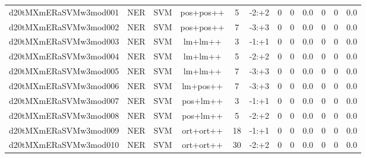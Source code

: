 \documentclass[a4paper]{article}
\begin{document}
\begin{landscape}
\begin{center}
\begin{tabular}{ |c|c|c|c|c|c|c|c|c|c|c|c|}
 
 	
 	\small{ d20tMXmERaSVMw3mod001 } & \small{ NER} & \small{  SVM }  & pos+pos++  &  5 &  \small{  -2:+2 }  &  0 & 0 & 0.0  &  0 & 0 & 0.0 \\
 	

 
 	
 	\small{ d20tMXmERaSVMw3mod002 } & \small{ NER} & \small{  SVM }  & pos+pos++  &  7 &  \small{  -3:+3 }  &  0 & 0 & 0.0  &  0 & 0 & 0.0 \\
 	

 
 	
 	\small{ d20tMXmERaSVMw3mod003 } & \small{ NER} & \small{  SVM }  & lm+lm++  &  3 &  \small{  -1:+1 }  &  0 & 0 & 0.0  &  0 & 0 & 0.0 \\
 	

 
 	
 	\small{ d20tMXmERaSVMw3mod004 } & \small{ NER} & \small{  SVM }  & lm+lm++  &  5 &  \small{  -2:+2 }  &  0 & 0 & 0.0  &  0 & 0 & 0.0 \\
 	

 
 	
 	\small{ d20tMXmERaSVMw3mod005 } & \small{ NER} & \small{  SVM }  & lm+lm++  &  7 &  \small{  -3:+3 }  &  0 & 0 & 0.0  &  0 & 0 & 0.0 \\
 	

 
 	
 	\small{ d20tMXmERaSVMw3mod006 } & \small{ NER} & \small{  SVM }  & lm+pos++  &  7 &  \small{  -3:+3 }  &  0 & 0 & 0.0  &  0 & 0 & 0.0 \\
 	

 
 	
 	\small{ d20tMXmERaSVMw3mod007 } & \small{ NER} & \small{  SVM }  & pos+lm++  &  3 &  \small{  -1:+1 }  &  0 & 0 & 0.0  &  0 & 0 & 0.0 \\
 	

 
 	
 	\small{ d20tMXmERaSVMw3mod008 } & \small{ NER} & \small{  SVM }  & pos+lm++  &  5 &  \small{  -2:+2 }  &  0 & 0 & 0.0  &  0 & 0 & 0.0 \\
 	

 
 	
 	\small{ d20tMXmERaSVMw3mod009 } & \small{ NER} & \small{  SVM }  & ort+ort++  &  18 &  \small{  -1:+1 }  &  0 & 0 & 0.0  &  0 & 0 & 0.0 \\
 	

 
 	
 	\small{ d20tMXmERaSVMw3mod010 } & \small{ NER} & \small{  SVM }  & ort+ort++  &  30 &  \small{  -2:+2 }  &  0 & 0 & 0.0  &  0 & 0 & 0.0 \\
 	


\end{tabular}
\end{center}
\end{landscape}
\end{document}
